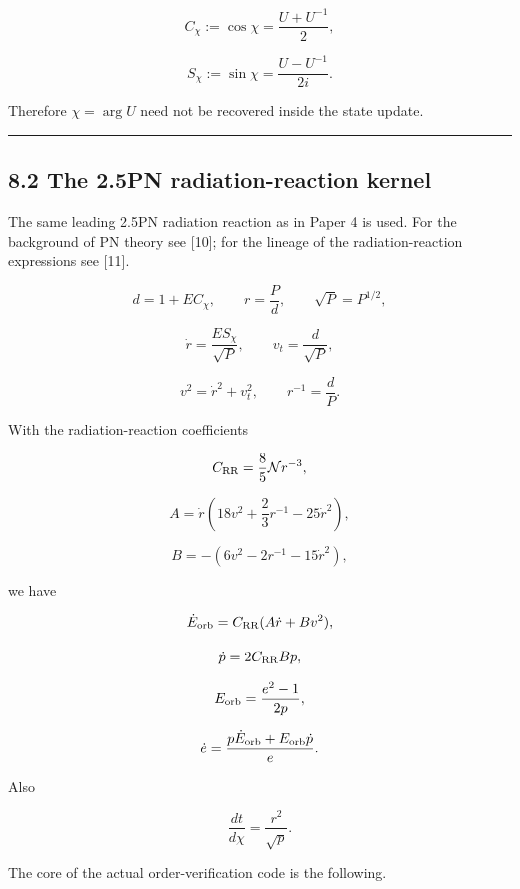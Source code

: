 \documentclass[
  a4paper,
]{article}
\begin{document}
\[
C_\chi:=\cos\chi
=\frac{U+U^{-1}}2,
\]

\[
S_\chi:=\sin\chi
=\frac{U-U^{-1}}{2i}.
\]

Therefore \(\chi=\arg U\) need not be recovered inside the state update.

\begin{center}\rule{0.5\linewidth}{0.5pt}\end{center}

\subsection{8.2 The 2.5PN radiation-reaction
kernel}\label{the-2.5pn-radiation-reaction-kernel}

The same leading 2.5PN radiation reaction as in Paper 4 is used. For the
background of PN theory see {[}10{]}; for the lineage of the
radiation-reaction expressions see {[}11{]}.

\[
d=1+EC_\chi,
\qquad
r=\frac Pd,
\qquad
\sqrt P=P^{1/2},
\]

\[
\dot r=\frac{ES_\chi}{\sqrt P},
\qquad
v_t=\frac d{\sqrt P},
\]

\[
v^2=\dot r^2+v_t^2,
\qquad
r^{-1}=\frac dP.
\]

With the radiation-reaction coefficients

\[
C_{\rm RR}=\frac85\mathcal N r^{-3},
\]

\[
A
=\dot r
\left(
18v^2+\frac23r^{-1}-25\dot r^2
\right),
\]

\[
B
=-\left(
6v^2-2r^{-1}-15\dot r^2
\right),
\]

we have

\[
\dot E_{\rm orb}
=C_{\rm RR}(A\dot r+Bv^2),
\]

\[
\dot p=2C_{\rm RR}Bp,
\]

\[
E_{\rm orb}=\frac{e^2-1}{2p},
\]

\[
\dot e
=\frac{p\dot E_{\rm orb}+E_{\rm orb}\dot p}{e}.
\]

Also

\[
\frac{dt}{d\chi}
=\frac{r^2}{\sqrt p}.
\]

The core of the actual order-verification code is the following.
\end{document}
